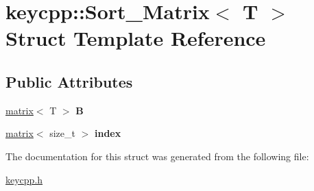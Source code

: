 \hypertarget{structkeycpp_1_1_sort___matrix}{\section{keycpp\-:\-:Sort\-\_\-\-Matrix$<$ T $>$ Struct Template Reference}
\label{structkeycpp_1_1_sort___matrix}
}
\subsection*{Public Attributes}
\begin{DoxyCompactItemize}
\item 
\hypertarget{structkeycpp_1_1_sort___matrix_acd2c90a02e9c57964fd924d75eece798}{\hyperlink{classkeycpp_1_1matrix}{matrix}$<$ T $>$ {\bfseries B}}\label{structkeycpp_1_1_sort___matrix_acd2c90a02e9c57964fd924d75eece798}

\item 
\hypertarget{structkeycpp_1_1_sort___matrix_a45d52509b6ba6164098c1aa8ef5c4af9}{\hyperlink{classkeycpp_1_1matrix}{matrix}$<$ size\-\_\-t $>$ {\bfseries index}}\label{structkeycpp_1_1_sort___matrix_a45d52509b6ba6164098c1aa8ef5c4af9}

\end{DoxyCompactItemize}


The documentation for this struct was generated from the following file\-:\begin{DoxyCompactItemize}
\item 
\hyperlink{keycpp_8h}{keycpp.\-h}\end{DoxyCompactItemize}
